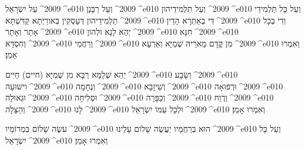 \documentclass[12pt, a5paper, twoside, extrafontsizes]{memoir}
\renewcommand{\leadword}[1]{%
  \lettrine[lines=2]{#1}{}
}
\renewcommand{\hdot}{\textenglish{^^^^2009}^^^^e010 }
\newcommand{\para}[2]{\leadword{#1}#2}
\begin{document}
    \para{עַל}{יִשְׂרָאֵל\hdot וְעַל רַבָּנָן\hdot וְעַל תַּלְמִידֵיהון\hdot
      וְעַל כָּל תַּלְמִידֵי תַלְמִידֵיהון דְּעָסְקִין בְּאורַיְתָא קַדִּשְׁתָּא\hdot
      דִּי בְאַתְרָא הָדֵין\hdot וְדִי בְכָל אָתָר וְאָתָר\hdot יְהֵא לָנָא וּלְהון\hdot
      חִנָּא\hdot וְחִסְדָּא\hdot וְרַחֲמֵי\hdot מִן קֳדָם מָארֵיהּ שְׁמַיָּא וְאַרְעָא\hdot
      וְאִמְרוּ אָמֵן׃}

    \para{יְהֵא}{שְׁלָמָא רַבָּא מִן שְׁמַיָּא ({\smaller חיים}) חַיִּים\hdot וְשָׂבָע\hdot
      וִישׁוּעָה\hdot וְנֶחָמָה\hdot וְשֵׁיזָבָא\hdot וּרְפוּאָה\hdot
      וּגְאוּלָה\hdot וּסְלִיחָה\hdot וְכַפָּרָה\hdot וְרֶוַח\hdot וְהַצָּלָה\hdot
      לָנוּ\hdot וּלְכָל עַמּוֹ יִשְׂרָאֵל\hdot וְאִמְרוּ אָמֵן׃}

    עֹשֶׂה שָׁלוֹם בִּמְרוֹמָיו\hdot הוּא בְּרַחֲמָיו יַעֲשֶׂה שָׁלוֹם עָלֵינוּ\hdot
    וְעַל כָּל יִשְׂרָאֵל\hdot וְאִמְרוּ אָמֵן׃
\end{document}
